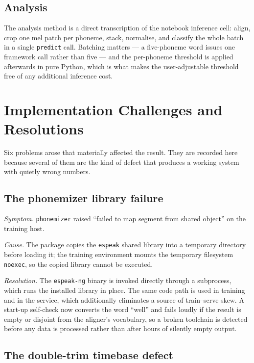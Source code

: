 \subsection{Analysis}

The analysis method is a direct transcription of the notebook inference cell:
align, crop one mel patch per phoneme, stack, normalise, and classify the whole
batch in a single \texttt{predict} call. Batching matters --- a five-phoneme word
issues one framework call rather than five --- and the per-phoneme threshold is
applied afterwards in pure Python, which is what makes the user-adjustable
threshold free of any additional inference cost.

\section{Implementation Challenges and Resolutions}
\label{sec:impl-challenges}

Six problems arose that materially affected the result. They are recorded here
because several of them are the kind of defect that produces a working system
with quietly wrong numbers.

\subsection{The phonemizer library failure}

\emph{Symptom.} \texttt{phonemizer} raised ``failed to map segment from shared
object'' on the training host.

\emph{Cause.} The package copies the \texttt{espeak} shared library into a
temporary directory before loading it; the training environment mounts the
temporary filesystem \texttt{noexec}, so the copied library cannot be executed.

\emph{Resolution.} The \texttt{espeak-ng} binary is invoked directly through a
subprocess, which runs the installed library in place. The same code path is
used in training and in the service, which additionally eliminates a source of
train--serve skew. A start-up self-check now converts the word ``well'' and
fails loudly if the result is empty or disjoint from the aligner's vocabulary,
so a broken toolchain is detected before any data is processed rather than after
hours of silently empty output.

\subsection{The double-trim timebase defect}

